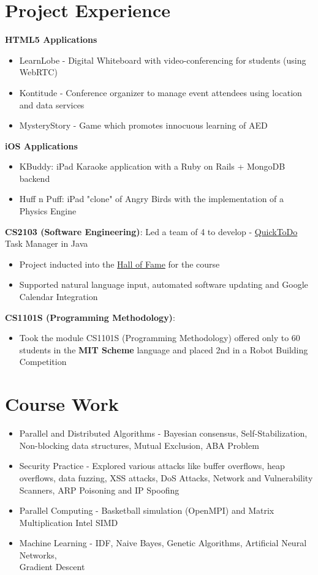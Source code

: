 \documentclass[11pt,a4paper]{moderncv}
\begin{document}
\section{Project Experience}
\textbf{HTML5 Applications}
\begin{itemize}
    \item LearnLobe - Digital Whiteboard with video-conferencing for students (using WebRTC)
    \item Kontitude - Conference organizer to manage event attendees using location and data services
    \item MysteryStory - Game which promotes innocuous learning of AED
\end{itemize}
\textbf{iOS Applications}
\begin{itemize}
     \item KBuddy: iPad Karaoke application with a Ruby on Rails + MongoDB backend
     \item Huff n Puff: iPad "clone" of Angry Birds with the implementation of a Physics Engine
\end{itemize}
\textbf{CS2103 (Software Engineering)}: Led a team of 4 to develop - \href{http://github.com/vellvisher/quicktodo}{QuickToDo} Task Manager in Java
 \begin{itemize}
     \item Project inducted into the \href{http://www.comp.nus.edu.sg/~cs2103/AY1112S1projects/halloffame.html}{Hall of Fame}
         for the course
     \item Supported natural language input, automated software updating and Google Calendar Integration
 \end{itemize}
 \textbf{CS1101S (Programming Methodology)}:
 \begin{itemize}
    \item Took the module CS1101S (Programming Methodology) offered only
        to 60 students in the \textbf{MIT Scheme} language and placed 2nd in a Robot Building Competition
 \end{itemize}
\section{Course Work}
{\begin{itemize}
        \item Parallel and Distributed Algorithms - Bayesian consensus, Self-Stabilization, Non-blocking data structures,
            Mutual Exclusion, ABA Problem
 \item Security Practice - Explored various attacks like buffer overflows,
     heap overflows, data fuzzing, XSS attacks, DoS Attacks, Network and Vulnerability Scanners,
     ARP Poisoning and IP Spoofing
 \item Parallel Computing - Basketball simulation (OpenMPI) and Matrix Multiplication Intel SIMD
 \item Machine Learning - IDF, Naive Bayes, Genetic Algorithms, Artificial Neural Networks,\\ Gradient Descent
 \end{itemize}}
\end{document}
